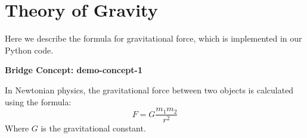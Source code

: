 \documentclass{article}
\newenvironment{bridgeblock}[1]{\par\noindent\textbf{Bridge Concept: #1}\par\begin{itshape}\ignorespaces}{%
  \end{itshape}\par
}
\begin{document}
\section*{Theory of Gravity}

Here we describe the formula for gravitational force, which is implemented in our Python code.

\begin{bridgeblock}{demo-concept-1}
In Newtonian physics, the gravitational force between two objects is calculated using the formula:
\[ F = G \frac{m_1 m_2}{r^2} \]
Where \(G\) is the gravitational constant.
\end{bridgeblock}
\end{document}
